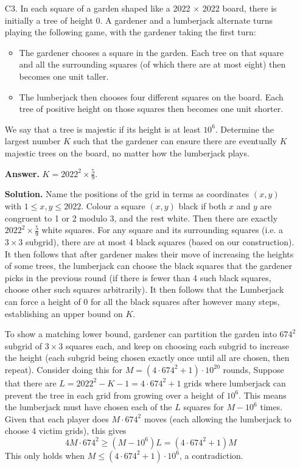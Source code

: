 \documentclass[11pt,a4paper]{article}
\begin{document}
\begin{enumerate}
    	\item[C3.]
    	In each square of a garden shaped like a 2022 $\times$ 2022 board, 
    	there is initially a tree of height 0. 
    	A gardener and a lumberjack alternate turns playing the following game, 
    	with the gardener taking the first turn:
    	\begin{itemize}
    		\item The gardener chooses a square in the garden. Each tree on that square and all the surrounding squares (of which there are at most eight) then becomes one unit taller. 
    		
    		\item The lumberjack then chooses four different squares on the board. Each tree of positive height on those squares then becomes one unit shorter.
    	\end{itemize}
    	We say that a tree is majestic if its height is at least $10^6$. 
    	Determine the largest number $K$ such that the gardener can ensure there are eventually $K$ majestic trees on the board, 
    	no matter how the lumberjack plays.
    	
    	\textbf{Answer.} $K=2022^2\times \frac 59$. 
    	
    	\textbf{Solution.} Name the positions of the grid in terms as coordinates $(x, y)$ with $1\le x, y\le 2022$. 
        Colour a square $(x, y)$ black if both $x$ and $y$ are congruent to 1 or 2 modulo 3, 
        and the rest white. 
        Then there are exactly $2022^2\times \frac 59$ white squares. 
        For any square and its surrounding squares (i.e. a $3\times 3$ subgrid), 
        there are at most 4 black squares (based on our construction). 
        It then follows that after gardener makes their move of increasing the heights of some trees, 
        the lumberjack can choose the black squares that the gardener picks in the previous round
        (if there is fewer than 4 such black squares, choose other such squares arbitrarily). 
        It then follows that the Lumberjack can force a height of 0 for all the black squares after however many steps, 
        establishing an upper bound on $K$. 
        
        To show a matching lower bound, gardener can partition the garden into $674^2$ subgrid of $3\times 3$ squares each, 
        and keep on choosing each subgrid to increase the height (each subgrid being chosen exactly once until all are chosen, then repeat). 
        Consider doing this for $M = (4\cdot 674^2 + 1)\cdot 10^{20}$ rounds, 
        Suppose that there are $L = 2022^2 - K - 1 = 4\cdot 674^2 + 1$ grids where lumberjack can prevent the tree in each grid from growing over a height of $10^6$. 
        This means the lumberjack must have chosen each of the $L$ squares for $M - 10^6$ times. 
        Given that each player does $M\cdot 674^2$ moves (each allowing the lumberjack to choose 4 victim grids), this gives 
        \[
        4M\cdot 674^2 \ge (M - 10^6)L = (4\cdot 674^2 + 1)M
        \]
        This only holds when $M \le (4\cdot 674^2 + 1)\cdot 10^6$, a contradiction. 
        

\end{enumerate}
\end{document}
